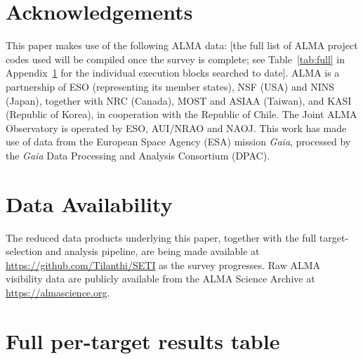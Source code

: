 \documentclass{openjournal}
\begin{document}
\section*{Acknowledgements}
This paper makes use of the following ALMA data: [the full list of ALMA
project codes used will be compiled once the survey is complete; see
Table~\ref{tab:full} in Appendix~\ref{app:table} for the individual
execution blocks searched to date]. ALMA is a partnership of ESO
(representing its member states), NSF (USA) and NINS (Japan), together with NRC
(Canada), MOST and ASIAA (Taiwan), and KASI (Republic of Korea), in cooperation
with the Republic of Chile. The Joint ALMA Observatory is operated by ESO,
AUI/NRAO and NAOJ. This work has made use of data from the European Space
Agency (ESA) mission {\it Gaia}, processed by the {\it Gaia} Data Processing and
Analysis Consortium (DPAC).

\section*{Data Availability}
The reduced data products underlying this paper, together with the full
target-selection and analysis pipeline, are being made available at
\url{https://github.com/Tilanthi/SETI} as the survey progresses. Raw ALMA
visibility data are publicly available from the ALMA Science Archive at
\url{https://almascience.org}.


\appendix
\section{Full per-target results table}
\label{app:table}
\end{document}
